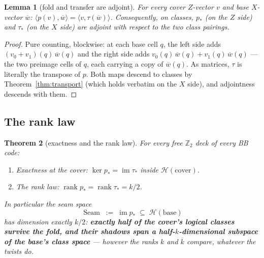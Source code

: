 \documentclass[11pt]{article}
\theoremstyle{plain}
\newtheorem{theorem}{Theorem}[section]
\newtheorem{lemma}[theorem]{Lemma}
\theoremstyle{definition}
\theoremstyle{remark}
\newcommand{\Z}{\mathbb{Z}}
\newcommand{\Seam}{\operatorname{Seam}}
\newcommand{\clH}{\mathcal{H}}
\newcommand{\base}{\mathrm{base}}
\newcommand{\cov}{\mathrm{cover}}
\newcommand{\ov}[1]{\overline{#1}}
\begin{document}
\begin{lemma}[fold and transfer are adjoint]\label{lem:adjoint}
For every cover $Z$-vector $v$ and base $X$-vector $\ov w$:
$\langle p(v), \ov w\rangle = \langle v, \tau(\ov w)\rangle$.
Consequently, on classes, $p_*$ (on the $Z$ side) and $\tau_*$ (on the
$X$ side) are adjoint with respect to the two class pairings.
\end{lemma}

\begin{proof}
Pure counting, blockwise: at each base cell $q$, the left side adds
$(v_0 + v_1)(q)\,\ov w(q)$ and the right side adds $v_0(q)\,\ov w(q) +
v_1(q)\,\ov w(q)$ --- the two preimage cells of $q$, each carrying a copy
of $\ov w(q)$. As matrices, $\tau$ is literally the transpose of $p$.
Both maps descend to classes by Theorem~\ref{thm:transport} (which holds
verbatim on the $X$ side), and adjointness descends with them.
\end{proof}

\subsection{The rank law}

\begin{theorem}[exactness and the rank law]\label{thm:ranklaw}
For every free $\Z_2$ deck of every BB code:
\begin{enumerate}[label=\emph{(\arabic*)},leftmargin=2.4em]
\item \emph{Exactness at the cover:} $\ker p_* = \operatorname{im}
  \tau_*$ inside $\clH(\cov)$.
\item \emph{The rank law:} $\operatorname{rank} p_* = \operatorname{rank}
  \tau_* = k/2$.
\end{enumerate}
In particular the \emph{seam space}
\[
\Seam \;:=\; \operatorname{im} p_* \;\subseteq\; \clH(\base)
\]
has dimension exactly $k/2$: \textbf{exactly half of the cover's logical
classes survive the fold, and their shadows span a half-$k$-dimensional
subspace of the base's class space} --- however the ranks $k$ and $\ov k$
compare, whatever the twists do.
\end{theorem}
\end{document}
